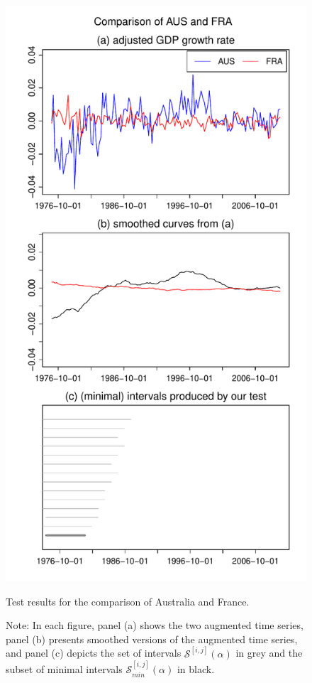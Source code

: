 \documentclass[a4paper,12pt]{article}
\begin{document}
\begin{figure}[p!]
\begin{minipage}[t]{0.49\textwidth}
\includegraphics[width=\textwidth]{Plots/gdp/AUS_vs_FRA}
\caption{Test results for the comparison of Australia and France.}\label{fig:Australia:France}
\end{minipage}
\caption*{Note: In each figure, panel (a) shows the two augmented time series, panel (b) presents smoothed versions of the augmented time series, and panel (c) depicts the set of intervals $\mathcal{S}^{[i, j]}(\alpha)$ in grey and the subset of minimal intervals $\mathcal{S}^{[i, j]}_{min}(\alpha)$ in black.}
\end{figure}
\end{document}
